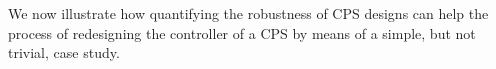 {%


%

We now illustrate how quantifying the robustness of CPS designs can help the process of redesigning the controller of a CPS by means of a simple, but not trivial, case study. 

%

%

}
